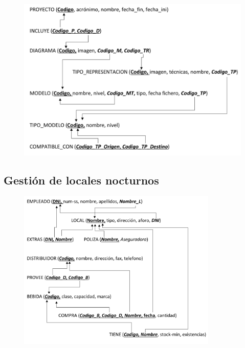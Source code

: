 \documentclass{db-practice}
\begin{document}
\begin{figure}[H]
    \includegraphics[width=\textwidth]{figs/paso-a-tablas/desarrollo-dirigido-por-modelos-sol}
\end{figure}

\subsection{Gestión de locales nocturnos}

\begin{figure}[H]
    \includegraphics[width=0.85\textwidth]{figs/paso-a-tablas/gestion-locales-nocturnos-sol}
\end{figure}
\end{document}

